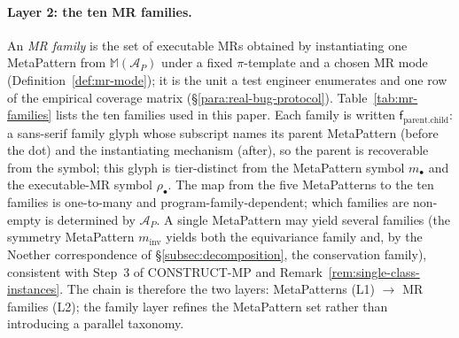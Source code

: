 \documentclass[acmsmall,screen,review]{acmart}
\begin{document}
\paragraph{Layer 2: the ten MR families.} An \emph{MR family} is the set of executable MRs obtained by instantiating one MetaPattern from $\mathbb{M}(\mathcal{A}_P)$ under a fixed $\pi$-template and a chosen MR mode (Definition~\ref{def:mr-mode}); it is the unit a test engineer enumerates and one row of the empirical coverage matrix (\S\ref{para:real-bug-protocol}). Table~\ref{tab:mr-families} lists the ten families used in this paper. Each family is written $\mathsf{f}_{\mathrm{parent}.\mathrm{child}}$: a sans-serif family glyph whose subscript names its parent MetaPattern (before the dot) and the instantiating mechanism (after), so the parent is recoverable from the symbol; this glyph is tier-distinct from the MetaPattern symbol $m_{\bullet}$ and the executable-MR symbol $\rho_{\bullet}$. The map from the five MetaPatterns to the ten families is one-to-many and program-family-dependent; which families are non-empty is determined by $\mathcal{A}_P$. A single MetaPattern may yield several families (the symmetry MetaPattern $m_{\mathrm{inv}}$ yields both the equivariance family and, by the Noether correspondence of \S\ref{subsec:decomposition}, the conservation family), consistent with Step~3 of CONSTRUCT-MP and Remark~\ref{rem:single-class-instances}. The chain is therefore the two layers: MetaPatterns (L1) $\to$ MR families (L2); the family layer refines the MetaPattern set rather than introducing a parallel taxonomy.
\end{document}
